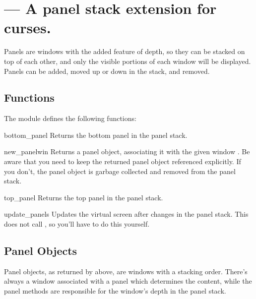 \section{ ---
         A panel stack extension for curses.}


Panels are windows with the added feature of depth, so they can be
stacked on top of each other, and only the visible portions of
each window will be displayed.  Panels can be added, moved up
or down in the stack, and removed. 

\subsection{Functions \label{cursespanel-functions}}

The module  defines the following functions:


\begin{funcdesc}{bottom_panel}{}
Returns the bottom panel in the panel stack.
\end{funcdesc}

\begin{funcdesc}{new_panel}{win}
Returns a panel object, associating it with the given window .
Be aware that you need to keep the returned panel object referenced
explicitly.  If you don't, the panel object is garbage collected and
removed from the panel stack.
\end{funcdesc}

\begin{funcdesc}{top_panel}{}
Returns the top panel in the panel stack.
\end{funcdesc}

\begin{funcdesc}{update_panels}{}
Updates the virtual screen after changes in the panel stack. This does
not call , so you'll have to do this yourself.
\end{funcdesc}

\subsection{Panel Objects \label{curses-panel-objects}}

Panel objects, as returned by  above, are windows
with a stacking order. There's always a window associated with a
panel which determines the content, while the panel methods are
responsible for the window's depth in the panel stack.

